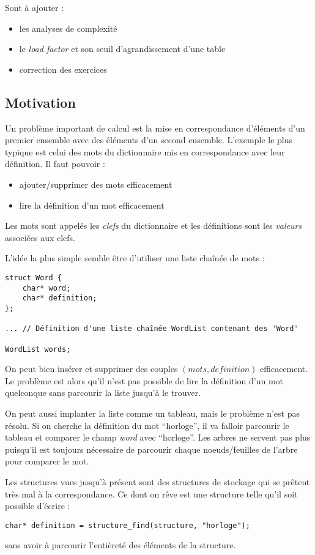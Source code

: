 \documentclass[../../../main.tex]{subfiles}
\begin{document}
Sont à ajouter :
\begin{itemize}
	\item les analyses de complexité
	\item le \textit{load factor} et son seuil d'agrandissement d'une table
	\item correction des exercices
\end{itemize}
\subsection{Motivation}
\label{sub:dict_motivation}
Un problème important de calcul est la mise en correspondance d'éléments d'un premier ensemble avec des éléments d'un second ensemble. L'exemple le plus typique est celui des mots du dictionnaire mis en correspondance avec leur définition. Il faut pouvoir :
\begin{itemize}
	\item ajouter/supprimer des mots efficacement
	\item lire la définition d'un mot efficacement
\end{itemize}
Les mots sont appelés les \textit{clefs} du dictionnaire et les définitions sont les \textit{valeurs} associées aux clefs.

L'idée la plus simple semble être d'utiliser une liste chaînée de mots :
\begin{verbatim}
struct Word {
	char* word;
	char* definition;
};

... // Définition d'une liste chaînée WordList contenant des 'Word'

WordList words;
\end{verbatim}
On peut bien insérer et supprimer des couples $(mots, definition)$ efficacement. Le problème est alors qu'il n'est pas possible de lire la définition d'un mot quelconque sans parcourir la liste jusqu'à le trouver.

On peut aussi implanter la liste comme un tableau, mais le problème n'est pas résolu. Si on cherche la définition du mot ``horloge'', il va falloir parcourir le tableau et comparer le champ \textit{word} avec ``horloge''. Les arbres ne servent pas plus puisqu'il est toujours nécessaire de parcourir chaque noeuds/feuilles de l'arbre pour comparer le mot.

Les structures vues jusqu'à présent sont des structures de stockage qui se prêtent très mal à la correspondance. Ce dont on rêve est une structure telle qu'il soit possible d'écrire :
\begin{verbatim}
char* definition = structure_find(structure, "horloge");
\end{verbatim}
sans avoir à parcourir l'entièreté des éléments de la structure.
\end{document}
